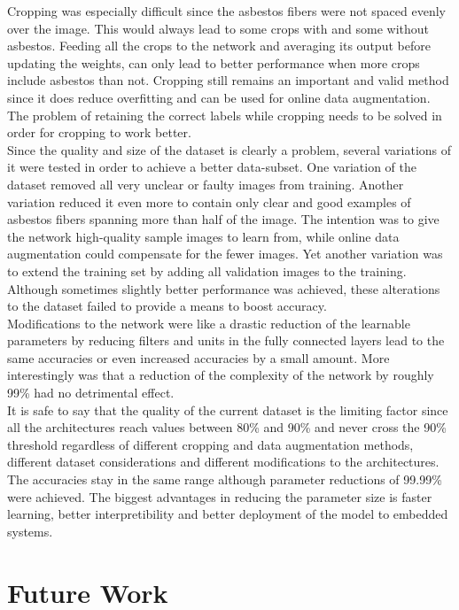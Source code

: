 Cropping was especially difficult since the asbestos fibers were not spaced evenly over the image. This would always lead to some crops with and some without asbestos. Feeding all the crops to the network and averaging its output before updating the weights, can only lead to better performance when more crops include asbestos than not. Cropping still remains an important and valid method since it does reduce overfitting and can be used for online data augmentation. The problem of retaining the correct labels while cropping needs to be solved in order for cropping to work better.\\


Since the quality and size of the dataset is clearly a problem, several variations of it were tested in order to achieve a better data-subset. One variation of the dataset removed all very unclear or faulty images from training. Another variation reduced it even more to contain only clear and good examples of asbestos fibers spanning more than half of the image. The intention was to give the network high-quality sample images to learn from, while online data augmentation could compensate for the fewer images. Yet another variation was to extend the training set by adding all validation images to the training. Although sometimes slightly better performance was achieved, these alterations to the dataset failed to provide a means to boost accuracy.\\


Modifications to the network were like a drastic reduction of the learnable parameters by reducing filters and units in the fully connected layers lead to the same accuracies or even increased accuracies by a small amount. More interestingly was that a reduction of the complexity of the network by roughly 99\% had no detrimental effect.\\


It is safe to say that the quality of the current dataset is the limiting factor since all the architectures reach values between 80\% and 90\% and never cross the 90\% threshold regardless of different cropping and data augmentation methods, different dataset considerations and different modifications to the architectures. The accuracies stay in the same range although parameter reductions of 99.99\% were achieved. The biggest advantages in reducing the parameter size is faster learning, better interpretibility and better deployment of the model to embedded systems.

\section{Future Work}


